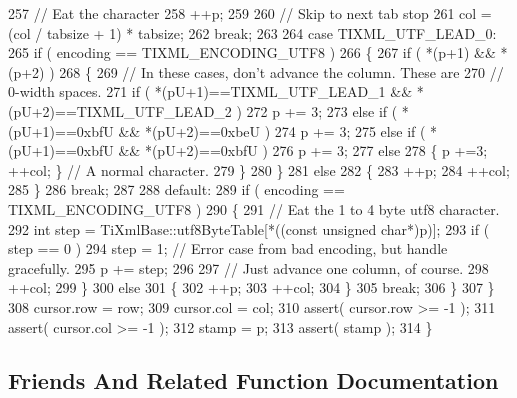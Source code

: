 \begin{DoxyCode}
257         \textcolor{comment}{// Eat the character}
258         ++p;
259 
260         \textcolor{comment}{// Skip to next tab stop}
261         col = (col / tabsize + 1) * tabsize;
262         \textcolor{keywordflow}{break};
263 
264       \textcolor{keywordflow}{case} TIXML_UTF_LEAD_0:
265         \textcolor{keywordflow}{if} ( encoding == TIXML_ENCODING_UTF8 )
266         \{
267           \textcolor{keywordflow}{if} ( *(p+1) && *(p+2) )
268           \{
269             \textcolor{comment}{// In these cases, don't advance the column. These are}
270             \textcolor{comment}{// 0-width spaces.}
271             \textcolor{keywordflow}{if} ( *(pU+1)==TIXML_UTF_LEAD_1 && *(pU+2)==TIXML_UTF_LEAD_2 )
272               p += 3; 
273             \textcolor{keywordflow}{else} \textcolor{keywordflow}{if} ( *(pU+1)==0xbfU && *(pU+2)==0xbeU )
274               p += 3; 
275             \textcolor{keywordflow}{else} \textcolor{keywordflow}{if} ( *(pU+1)==0xbfU && *(pU+2)==0xbfU )
276               p += 3; 
277             \textcolor{keywordflow}{else}
278               \{ p +=3; ++col; \} \textcolor{comment}{// A normal character.}
279           \}
280         \}
281         \textcolor{keywordflow}{else}
282         \{
283           ++p;
284           ++col;
285         \}
286         \textcolor{keywordflow}{break};
287 
288       \textcolor{keywordflow}{default}:
289         \textcolor{keywordflow}{if} ( encoding == TIXML_ENCODING_UTF8 )
290         \{
291           \textcolor{comment}{// Eat the 1 to 4 byte utf8 character.}
292           \textcolor{keywordtype}{int} step = TiXmlBase::utf8ByteTable[*((\textcolor{keyword}{const} \textcolor{keywordtype}{unsigned} \textcolor{keywordtype}{char}*)p)];
293           \textcolor{keywordflow}{if} ( step == 0 )
294             step = 1;   \textcolor{comment}{// Error case from bad encoding, but handle gracefully.}
295           p += step;
296 
297           \textcolor{comment}{// Just advance one column, of course.}
298           ++col;
299         \}
300         \textcolor{keywordflow}{else}
301         \{
302           ++p;
303           ++col;
304         \}
305         \textcolor{keywordflow}{break};
306     \}
307   \}
308   cursor.row = row;
309   cursor.col = col;
310   assert( cursor.row >= -1 );
311   assert( cursor.col >= -1 );
312   stamp = p;
313   assert( stamp );
314 \}
\end{DoxyCode}


\subsection{Friends And Related Function Documentation}
